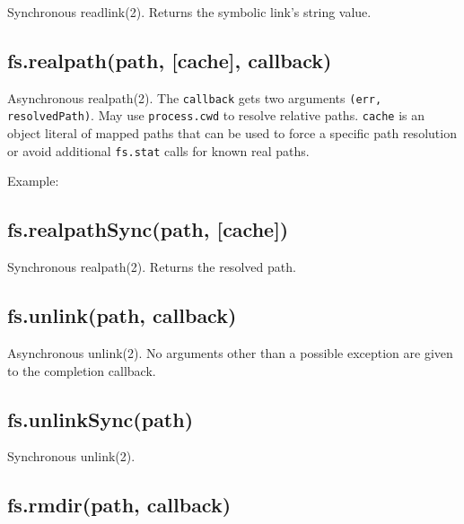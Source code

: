 Synchronous readlink(2). Returns the symbolic link's string value.

\subsection{fs.realpath(path, {[}cache{]}, callback)}

Asynchronous realpath(2). The \texttt{callback} gets two arguments
\texttt{(err, resolvedPath)}. May use \texttt{process.cwd} to resolve
relative paths. \texttt{cache} is an object literal of mapped paths that
can be used to force a specific path resolution or avoid additional
\texttt{fs.stat} calls for known real paths.

Example:

\begin{Shaded}
\begin{Highlighting}[]
 \NormalTok{:}\NormalTok{\};}
\NormalTok{(} 
    
\NormalTok{\});}
\end{Highlighting}
\end{Shaded}

\subsection{fs.realpathSync(path, {[}cache{]})}

Synchronous realpath(2). Returns the resolved path.

\subsection{fs.unlink(path, callback)}

Asynchronous unlink(2). No arguments other than a possible exception are
given to the completion callback.

\subsection{fs.unlinkSync(path)}

Synchronous unlink(2).

\subsection{fs.rmdir(path, callback)}

